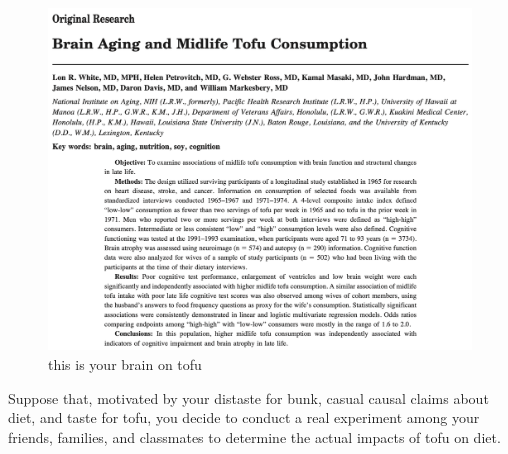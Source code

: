 \documentclass[
]{article}
\begin{document}
\begin{figure}
\centering
\includegraphics{./images/this_is_your_brain_on_tofu_abstract.png}
\caption{this is your brain on tofu}
\end{figure}

Suppose that, motivated by your distaste for bunk, casual causal claims about diet, and taste for tofu, you decide to conduct a real experiment among your friends, families, and classmates to determine the actual impacts of tofu on diet.
\end{document}
